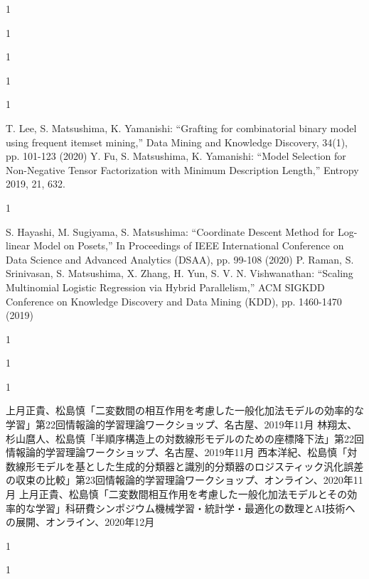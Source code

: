 \begin{招待講演}{1}

\end{招待講演}

\begin{招待論文}{1}

\end{招待論文}

\begin{受賞}{1}

\end{受賞}

\begin{著書}{1}

\end{著書}

\begin{雑誌論文}{1}

T. Lee, S. Matsushima, K. Yamanishi: “Grafting for combinatorial binary model using frequent itemset mining,” Data Mining and Knowledge Discovery, 34(1), pp. 101-123 (2020)
Y. Fu, S. Matsushima, K. Yamanishi: “Model Selection for Non-Negative Tensor Factorization with Minimum Description Length,” Entropy 2019, 21, 632.
\end{雑誌論文}

\begin{査読付}{1}

S. Hayashi, M. Sugiyama, S. Matsushima: “Coordinate Descent Method for Log-linear Model on Posets,”  In Proceedings of IEEE International Conference on Data Science and Advanced Analytics (DSAA), pp. 99-108 (2020)
P. Raman, S. Srinivasan, S. Matsushima, X. Zhang, H. Yun, S. V. N. Vishwanathan: “Scaling Multinomial Logistic Regression via Hybrid Parallelism,” ACM SIGKDD Conference on Knowledge Discovery and Data Mining (KDD), pp. 1460-1470 (2019)

\end{査読付}

\begin{公開}{1}

\end{公開}

\begin{特許}{1}

\end{特許}

\begin{発表}{1}

 上月正貴、松島慎「二変数間の相互作用を考慮した一般化加法モデルの効率的な学習」第22回情報論的学習理論ワークショップ、名古屋、2019年11月
 林翔太、杉山麿人、松島慎「半順序構造上の対数線形モデルのための座標降下法」第22回情報論的学習理論ワークショップ、名古屋、2019年11月
 西本洋紀、松島慎「対数線形モデルを基とした生成的分類器と識別的分類器のロジスティック汎化誤差の収束の比較」第23回情報論的学習理論ワークショップ、オンライン、2020年11月
 上月正貴、松島慎「二変数間相互作用を考慮した一般化加法モデルとその効率的な学習」科研費シンポジウム機械学習・統計学・最適化の数理とAI技術への展開、オンライン、2020年12月
\end{発表}

\begin{特記}{1}

\end{特記}

\begin{報道}{1}

\end{報道}

